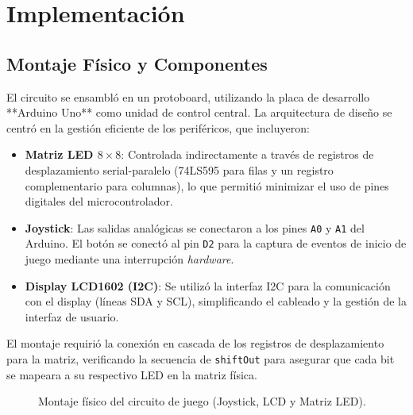\section{Implementación}

\subsection{Montaje Físico y Componentes}
El circuito se ensambló en un protoboard, utilizando la placa de desarrollo **Arduino Uno** como unidad de control central. La arquitectura de diseño se centró en la gestión eficiente de los periféricos, que incluyeron:

\begin{itemize}
        \item \textbf{Matriz LED $8\times8$}: Controlada indirectamente a través de registros de desplazamiento serial-paralelo (74LS595 para filas y un registro complementario para columnas), lo que permitió minimizar el uso de pines digitales del microcontrolador.
            \item \textbf{Joystick}: Las salidas analógicas se conectaron a los pines \texttt{A0} y \texttt{A1} del Arduino. El botón se conectó al pin \texttt{D2} para la captura de eventos de inicio de juego mediante una interrupción \textit{hardware}.
                \item \textbf{Display LCD1602 (I2C)}: Se utilizó la interfaz I2C para la comunicación con el display (líneas SDA y SCL), simplificando el cableado y la gestión de la interfaz de usuario.
\end{itemize}

El montaje requirió la conexión en cascada de los registros de desplazamiento para la matriz, verificando la secuencia de \texttt{shiftOut} para asegurar que cada bit se mapeara a su respectivo LED en la matriz física.

\begin{figure}[h]
        \centering
            \caption{Montaje físico del circuito de juego (Joystick, LCD y Matriz LED).}
                \label{fig:montaje_fisico}
\end{figure}


